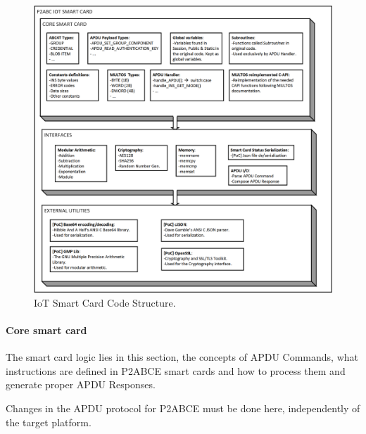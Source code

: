 
\begin{figure}[bth]
	\begin{center}
		\includegraphics[width=\linewidth]{gfx/IoTCScomponents-bw}
	\end{center}
	\caption{IoT Smart Card Code Structure.}
	\label{fig:IoTCScomponents-bw}
\end{figure}


\hfil

\paragraph{Core smart card}

The smart card logic lies in this section, the concepts of APDU Commands, what instructions are defined in P2ABCE smart cards and how to process them and generate proper APDU Responses.

Changes in the APDU protocol for P2ABCE must be done here, independently of the target platform.

